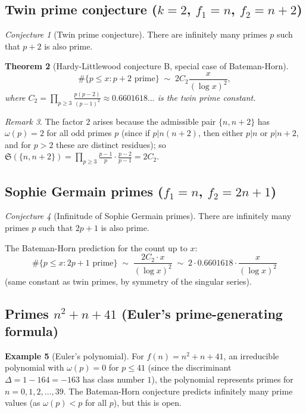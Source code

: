 \documentclass[12pt,a4paper]{amsart}
\newtheorem{theorem}{Theorem}[section]
\theoremstyle{definition}
\newtheorem{example}[theorem]{Example}
\theoremstyle{remark}
\newtheorem{remark}[theorem]{Remark}
\newtheorem{conjecture}[theorem]{Conjecture}
\newcommand{\BH}{\mathfrak{S}}
\begin{document}
\subsection{Twin prime conjecture ($k=2$, $f_1=n$, $f_2=n+2$)}

\begin{conjecture}[Twin prime conjecture]\label{conj:twin}
  There are infinitely many primes $p$ such that $p+2$ is also prime.
\end{conjecture}

\begin{theorem}[Hardy-Littlewood conjecture B, special case of Bateman-Horn]
  \[
    \#\{p \leq x : p+2 \text{ prime}\} \;\sim\;
    2C_2 \frac{x}{(\log x)^2},
  \]
  where $C_2 = \prod_{p \geq 3} \frac{p(p-2)}{(p-1)^2} \approx 0.6601618\ldots$
  is the \emph{twin prime constant}.
\end{theorem}

\begin{remark}
  The factor $2$ arises because the admissible pair $\{n, n+2\}$ has $\omega(p) = 2$
  for all odd primes $p$ (since if $p | n(n+2)$, then either $p|n$ or $p|n+2$, and
  for $p > 2$ these are distinct residues); so
  $\BH(\{n,n+2\}) = \prod_{p\geq 3} \frac{p-1}{p} \cdot \frac{p-2}{p-1} = 2C_2$.
\end{remark}

\subsection{Sophie Germain primes ($f_1 = n$, $f_2 = 2n+1$)}

\begin{conjecture}[Infinitude of Sophie Germain primes]\label{conj:sg}
  There are infinitely many primes $p$ such that $2p+1$ is also prime.
\end{conjecture}

The Bateman-Horn prediction for the count up to $x$:
\[
  \#\{p \leq x : 2p+1 \text{ prime}\}
  \;\sim\;
  \frac{2C_2 \cdot x}{(\log x)^2}
  \;\sim\; 2 \cdot 0.6601618 \cdot \frac{x}{(\log x)^2}
\]
(same constant as twin primes, by symmetry of the singular series).

\subsection{Primes $n^2 + n + 41$ (Euler's prime-generating formula)}

\begin{example}[Euler's polynomial]
  For $f(n) = n^2 + n + 41$, an irreducible polynomial with $\omega(p) = 0$ for
  $p \leq 41$ (since the discriminant $\Delta = 1 - 164 = -163$ has class number $1$),
  the polynomial represents primes for $n = 0, 1, 2, \ldots, 39$.
  The Bateman-Horn conjecture predicts infinitely many prime values (as $\omega(p) < p$
  for all $p$), but this is open.
\end{example}
\end{document}
